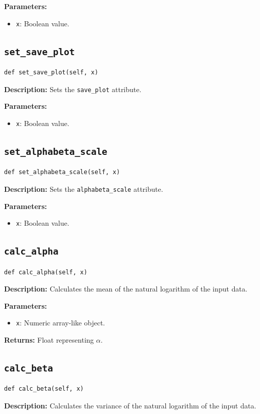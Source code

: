\documentclass[
	ngerman,							%
	a4paper,							%
	11pt,							%
	oneside							%
	]{article}							%
\begin{document}
\textbf{Parameters:}
\begin{itemize}
    \item \texttt{x}: Boolean value.
\end{itemize}

\subsection{\texttt{set\_save\_plot}}
\begin{lstlisting}
def set_save_plot(self, x)
\end{lstlisting}
\textbf{Description:} Sets the \texttt{save\_plot} attribute.

\textbf{Parameters:}
\begin{itemize}
    \item \texttt{x}: Boolean value.
\end{itemize}

\subsection{\texttt{set\_alphabeta\_scale}}
\begin{lstlisting}
def set_alphabeta_scale(self, x)
\end{lstlisting}
\textbf{Description:} Sets the \texttt{alphabeta\_scale} attribute.

\textbf{Parameters:}
\begin{itemize}
    \item \texttt{x}: Boolean value.
\end{itemize}

\subsection{\texttt{calc\_alpha}}
\begin{lstlisting}
def calc_alpha(self, x)
\end{lstlisting}
\textbf{Description:} Calculates the mean of the natural logarithm of the input data.

\textbf{Parameters:}
\begin{itemize}
    \item \texttt{x}: Numeric array-like object.
\end{itemize}

\textbf{Returns:} Float representing $\alpha$.

\subsection{\texttt{calc\_beta}}
\begin{lstlisting}
def calc_beta(self, x)
\end{lstlisting}
\textbf{Description:} Calculates the variance of the natural logarithm of the input data.
\end{document}
